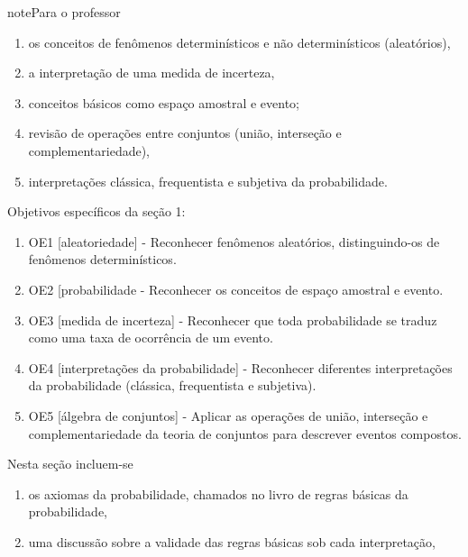 \begin{sphinxadmonition}{note}{Para o professor}
\begin{enumerate}
\begin{enumerate}
\item {} 
os conceitos de fenômenos determinísticos e não determinísticos (aleatórios),

\item {} 
a interpretação de uma medida de incerteza,

\item {} 
conceitos básicos como espaço amostral e evento;

\item {} 
revisão de operações entre conjuntos (união, interseção e complementariedade),

\item {} 
interpretações clássica, frequentista e subjetiva da probabilidade.

\end{enumerate}

Objetivos específicos da seção 1:
\begin{enumerate}
\item {} 
OE1 {[}aleatoriedade{]} - Reconhecer fenômenos aleatórios, distinguindo-os de fenômenos determinísticos.

\item {} 
OE2 {[}probabilidade - Reconhecer os conceitos de espaço amostral e evento.

\item {} 
OE3 {[}medida de incerteza{]} -  Reconhecer que toda probabilidade se traduz como uma taxa de ocorrência de um evento.

\item {} 
OE4 {[}interpretações da probabilidade{]} - Reconhecer diferentes interpretações da probabilidade (clássica, frequentista e subjetiva).

\item {} 
OE5 {[}álgebra de conjuntos{]} - Aplicar as operações de união, interseção e complementariedade da teoria de conjuntos para descrever eventos compostos.

\end{enumerate}


Nesta seção incluem-se
\begin{enumerate}
\item {} 
os axiomas da probabilidade, chamados no livro de regras básicas da probabilidade,

\item {} 
uma discussão sobre a validade das regras básicas sob cada interpretação,


\end{enumerate}
\end{enumerate}
\end{sphinxadmonition}
